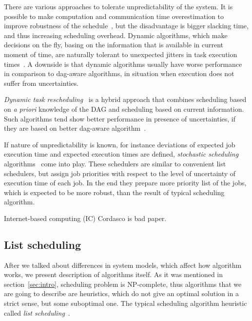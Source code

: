 There are various approaches to tolerate unpredictability of the
system. It is possible to make computation and communication time
overestimation to improve robustness of the
schedule~\cite{canon2008comparative}, but the disadvantage is bigger
slacking time, and thus increasing scheduling overhead. Dynamic
algorithms, which make decisions on the fly, basing on the information
that is available in current moment of time, are naturally tolerant to
unexpected jitters in task execution times~. A
downside is that dynamic algorithms usually have worse performance in
comparison to dag-aware algorithms, in situation when execution does
not suffer from uncertainties.

\emph{Dynamic task rescheduling}~\cite{sakellariou2004low,
  maheswaran1998dynamic} is a hybrid approach that combines scheduling
based on \textit{a priori} knowledge of the DAG and scheduling based
on current information. Such algorithms tend show better performance
in presence of uncertainties, if they are based on better dag-aware
algorithm~\cite{canon2008comparative}.

If nature of unpredictability is known, for instance deviations of
expected job execution time and expected execution times are defined,
\emph{stochastic scheduling} algorithms~\cite{zheng20131673,
  tang2011stochastic} come into play. These schedulers are similar to
convenient list schedulers, but assign job priorities with respect to
the level of uncertainty of execution time of each job. In the end
they prepare more priority list of the jobs, which is expected to be
more robust, than the result of typical scheduling algorithm.

Internet-based computing (IC) \cite{cordasco2010extending,
  rosenberg2004scheduling} Cordasco is
bad paper.

\subsection{List scheduling}
\label{sec:list}

After we talked about differences in system models, which affect how
algorithm works, we present description of algorithms itself. As it
was mentioned in section~\ref{sec:intro}, scheduling problem is
NP-complete, thus algorithms that we are going to describe are
heuristics, which do not give an optimal solution in a strict sense,
but some suboptimal one. The typical scheduling algorithm heuristic
called \emph{list scheduling}~\cite{adam1974, Papadimitriou1979,
  schutten1996list, kwok1999static, falzon2012enhancing,
  arabnejad2014list}.

